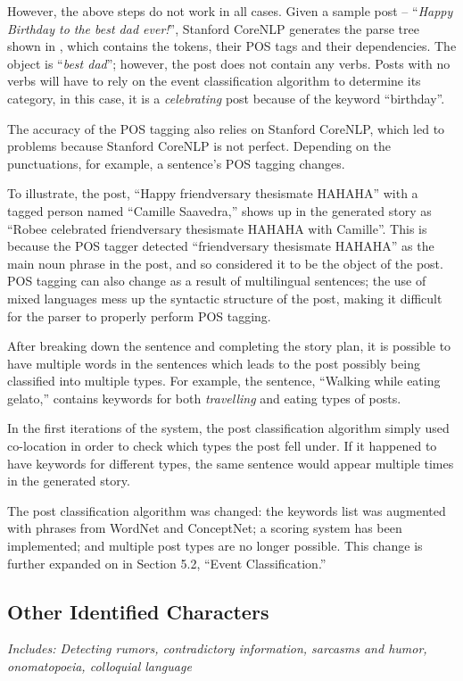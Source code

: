 However, the above steps do not work in all cases. Given a sample post -- ``\textit{Happy Birthday to the best dad ever!}'', Stanford CoreNLP generates the parse tree shown in , which contains the tokens, their POS tags and their dependencies. The object is ``\textit{best dad}''; however, the post does not contain any verbs. Posts with no verbs will have to rely on the event classification algorithm to determine its category, in this case, it is a \textit{celebrating} post because of the keyword ``birthday''.

The accuracy of the POS tagging also relies on Stanford CoreNLP, which led to problems because Stanford CoreNLP is not perfect. Depending on the punctuations, for example, a sentence's POS tagging changes. 

To illustrate, the post, ``Happy friendversary thesismate HAHAHA'' with a tagged person named ``Camille Saavedra,'' shows up in the generated story as ``Robee celebrated friendversary thesismate HAHAHA with Camille''. This is because the POS tagger detected ``friendversary thesismate HAHAHA'' as the main noun phrase in the post, and so considered it to be the object of the post. POS tagging can also change as a result of multilingual sentences; the use of mixed languages mess up the syntactic structure of the post, making it difficult for the parser to properly perform POS tagging.

After breaking down the sentence and completing the story plan, it is possible to have multiple words in the sentences which leads to the post possibly being classified into multiple types. For example, the sentence, ``Walking while eating gelato,'' contains keywords for both \textit{travelling} and eating types of posts.

In the first iterations of the system, the post classification algorithm simply used co-location in order to check which types the post fell under. If it happened to have keywords for different types, the same sentence would appear multiple times in the generated story.

The post classification algorithm was changed: the keywords list was augmented with phrases from WordNet and ConceptNet; a scoring system has been implemented; and multiple post types are no longer possible. This change is further expanded on in Section 5.2, ``Event Classification.''

\subsection{Other Identified Characters}
\textit{Includes: Detecting rumors, contradictory information, sarcasms and humor, onomatopoeia, colloquial language}

